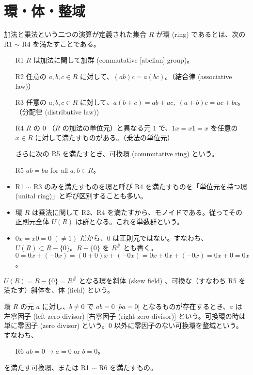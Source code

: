 \setcounter{page}{0}
\maketitle

\newpage
\section{環・体・整域}
\begin{definition}
加法と乗法という二つの演算が定義された集合 $R$ が環 (ring) であるとは、次の R1 $\sim$ R4 を満たすことである。
\begin{itemize}
\item[R1] $R$ は加法に関して加群 (commutative [abelian] group)。
\item[R2]  任意の $a, b, c\in R$ に対して、$(ab)c = a(bc)$。（結合律 (associative law)）
\item[R3]  任意の $a, b, c\in R$ に対して、$a(b+c) = ab + ac, \;(a+b)c = ac + bc$。（分配律 (distributive law))
\item[R4] $R$ の $0$ （$R$ の加法の単位元）と異なる元 $1$ で、$1x = x1 = x$ を任意の $x\in R$ に対して満たすものがある。（乗法の単位元）

さらに次の R5 を満たすとき、可換環 (commutative ring) という。
\item[R5] $ab = ba$ for all $a, b\in R$。
\end{itemize}
\end{definition}

\note 
\begin{itemize}
\item R1 $\sim$ R3 のみを満たすものを環と呼び R4 を満たすものを「単位元を持つ環 (unital ring)」と呼び区別することも多い。
\item 環 $R$ は乗法に関して R2、R4 を満たすから、モノイドである。従ってその正則元全体 $U(R)$ は群となる。これを単数群という。 
\item $0x = x0 = 0\;(\neq 1)$ だから、$0$ は正則元ではない。すなわち、$U(R)\subset R-\{0\}$。$R-\{0\}$ を $R^{\#}$ とも書く。\\
\pf  $0 = 0x + (-0x) = (0+0)x + (-0x) = 0x + 0x + (-0x) = 0x + 0 = 0x$。
\end{itemize}

\begin{definition}
$U(R) = R - \{0\} = R^{\#}$ となる環を斜体 (skew field) 、可換な（すなわち R5 を満たす）斜体を、体 (field) という。
\end{definition}

\begin{definition}
環 $R$ の元 $a$ に対し、$b\neq 0$ で $ab = 0$ [$ba = 0$] となるものが存在するとき、$a$ は左零因子 (left zero divisor) [右零因子 (right zero divisor)] という。可換環の時は単に零因子 (zero divisor) という。$0$  以外に零因子のない可換環を整域という。すなわち、
\begin{itemize}
\item[R6] $ab = 0 \longrightarrow a = 0 \mbox{ or } b = 0$。
\end{itemize}
を満たす可換環、または R1 $\sim$ R6 を満たすもの。
\end{definition}

